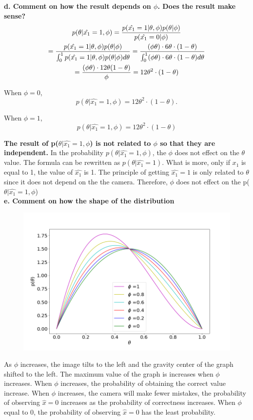 \documentclass{article}
\begin{document}
\textbf{d. Comment on how the result depends on $\phi$. Does the result make sense?}
\begin{gather}
p(\theta|\hat{x_1} = 1,\phi)=\frac{p(\hat{x_1} =1|\theta,\phi) p(\theta|\phi)}{p(\hat{x_1} = 0|\phi)} \notag\\
= \frac{p(\hat{x_1} =1|\theta,\phi) p(\theta|\phi)}{\int_0^1{p(\hat{x_1} =1|\theta,\phi) p(\theta|\phi)}d\theta} = \frac{(\phi \theta)\cdot 6\theta \cdot(1-\theta)}{\int_0^1 (\phi \theta)\cdot 6\theta \cdot(1-\theta) d\theta} \notag \\ = \frac{(\phi\theta)\cdot 12\theta (1-\theta)}{\phi} = 12 \theta^2 \cdot(1-\theta)
\end{gather}

When $\phi = 0$, \[ p(\theta|\hat{x_1} =1,\phi)  =  12 \theta^2 \cdot(1-\theta). \]  

When $\phi = 1$, \[ p(\theta|\hat{x_1} =1,\phi) =  12 \theta^2 \cdot(1-\theta) \]

\textbf{The result of p($\theta|\hat{x_1} = 1,\phi$) is not related to $\phi$ so that they are independent.} In the probability $p(\theta|\hat{x_1} =1,\phi)$, the $\phi$ does not effect on the $\theta$ value. The formula can be rewritten as $p(\theta|\hat{x_1} =1)$. What is more, only if $x_1$ is equal to 1, the value of $\hat{x_1}$ is 1. The principle of getting $\hat{x_1} = 1$ is only related to $\theta$ since it does not depend on the the camera. Therefore, $\phi$ does not effect on the p($\theta|\hat{x_1} = 1,\phi$)\\

\textbf{e. Comment on how the shape of the distribution }
\begin{figure}[H]
\centering
\includegraphics[width = \linewidth]{4.png}
\end{figure}
As $\phi$ increases, the image tilts to the left and the gravity center of the graph shifted to the left. The maximum value of the graph is increases when $\phi$ increases. When $\phi$ increases, the probability of obtaining the correct value increase. When $\phi$ increases, the camera will make fewer mistakes, the probability of observing $\hat{x} = 0$ increases as the probability of correctness increases. When $\phi$ equal to 0, the probability of observing $\hat{x} =0$ has the least probability. \\
\end{document}
